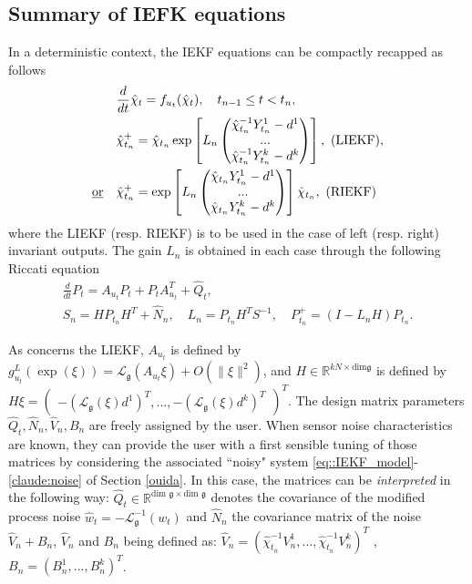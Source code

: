 \documentclass[a4paper,12pt,onecolumn]{article}
\newcommand{\RR}{{\mathbb{R}}}
\newcommand{\norm}[1]{\lVert#1\rVert}
\begin{document}
\subsection{Summary of IEFK equations}
In a deterministic context, the IEKF equations can be compactly recapped as follows
\begin{equation}
\begin{aligned}
&\frac{d}{dt}\hat{\chi}_t  = f_{u_t}(\hat{\chi}_t),\quad  t_{n-1}\leq t< t_n , \\ 
&\hat{\chi}_{t_n}^+  = \hat{\chi}_{t_n} \exp \left[ L_n
\begin{pmatrix}
\hat{\chi}_{t_n}^{-1} Y_{t_n}^1- d^1 \\
... \\
\hat{\chi}_{t_n}^{-1} Y_{t_n}^k - d^k
\end{pmatrix} \right], ~\text{(LIEKF)},\\ \text{\underline{or}}\quad & \hat{\chi}_{t_n}^+  = \exp \left[ L_n
\begin{pmatrix}
\hat{\chi}_{t_n} Y_{t_n}^1- d^1 \\
... \\
\hat{\chi}_{t_n} Y_{t_n}^k - d^k
\end{pmatrix} \right] \hat{\chi}_{t_n},  ~\text{(RIEKF)}
\end{aligned} \label{LIEKF:::eq}\end{equation}
where the LIEKF (resp. RIEKF) is to be used in the case of left (resp. right) invariant outputs. The gain $L_n$ is obtained in each case through the following Riccati equation
\begin{equation}
\label{eq::Riccati_Left}
\begin{gathered}
\frac{d}{dt} P_t  = A_{u_t} P_t + P_t A_{u_t}^T +\hat{Q}_t , \\
S_n  = H P_{t_n} H^T + \hat{N}_n , \quad
L_n  = P_{t_n} H^T S^{-1} , \quad
P_{t_n}^+ = (I-L_n H) P_{t_n}.
\end{gathered}
\end{equation}

As concerns the LIEKF, $A_{u_t}$ is defined by $g^L_{u_t}(\exp(\xi)) = \mathcal L_{\mathfrak{g}}(A_{u_t} \xi) + O (\norm{\xi}^2)$, and $H\in\RR^{kN\times\mathrm{dim}\mathfrak{g}}$ is defined by $H\xi=
\begin{pmatrix}
-\left( \mathcal{L}_{\mathfrak{g}} (\xi) d^1 \right)^T,
...,
-\left( \mathcal{L}_{\mathfrak{g}} (\xi) d^k  \right)^T
\end{pmatrix}^T$.  
The design matrix parameters $\hat Q_t, \hat{N}_n,\hat{V}_n, B_n$ are freely assigned by the user. When sensor noise characteristics are known, they can provide the user with a first sensible tuning of those matrices by considering the associated ``noisy" system \eqref{eq::IEKF_model}-\eqref{claude:noise} of Section \ref{ouida}. In this case, the matrices can be \emph{interpreted} in the following way:   $\hat{Q}_t\in\RR^{\text{dim }\mathfrak{g}\times \text{dim }\mathfrak{g}}$  denotes the covariance  of the modified process noise $\hat w_t=-\mathcal L^{-1}_{\mathfrak{g}}(w_t)$ and $\hat{N}_n$ the covariance matrix of the noise $\hat{V}_n+ B_n$, $\hat{V}_n$ and $B_n$ being defined as:
 $ \hat V_n= ( \hat{\chi}_{t_n}^{-1}V_n^1, ... ,
\hat{\chi}_{t_n}^{-1}V_n^k )^T$ , $B_n= (
 B_n^1 , ... ,  B_n^k )^T$.
\end{document}
